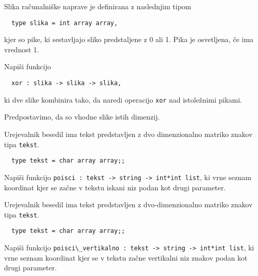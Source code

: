\begin{ex}
  Slika ra\v cunalni\v ske naprave je definirana z naslednjim tipom

  \begin{lstlisting}
  type slika = int array array,
\end{lstlisting}

  kjer so pike, ki sestavljajo sliko predstaljene z 0 ali 1. Pika je
  osvetljena, \v ce ima vrednost 1.

  Napi\v si funkcijo

  \begin{lstlisting}
  xor : slika -> slika -> slika,
\end{lstlisting}

  ki dve slike kombinira tako, da naredi operacijo \lstinline{xor} nad
  istole\v znimi pikami.

  Predpostavimo, da so vhodne slike istih dimenzij.


\end{ex} 
\begin{ex}
  Urejevalnik besedil ima tekst predstavljen z dvo dimenzionalno
  matriko znakov tipa \lstinline{tekst}.

  \begin{lstlisting}
  type tekst = char array array;;
\end{lstlisting}
  Napi\v si funkcijo 
  \lstinline{poisci : tekst -> string -> int*int list}, 
  ki vrne seznam koordinat kjer se 
  za\v cne v tekstu iskani niz
  podan kot drugi parameter. 


\end{ex} 
\begin{ex}
  Urejevalnik besedil ima tekst predstavljen z dvo-dimenzionalno
  matriko znakov tipa \lstinline{tekst}.

  \begin{lstlisting}
  type tekst = char array array;;
  \end{lstlisting}

  Napi\v si funkcijo 
  \lstinline{poisci\_vertikalno : tekst -> string -> int*int list}, 
  ki vrne seznam koordinat kjer se v tekstu za\v cne
  vertikalni niz znakov podan kot drugi parameter.


\end{ex} 
